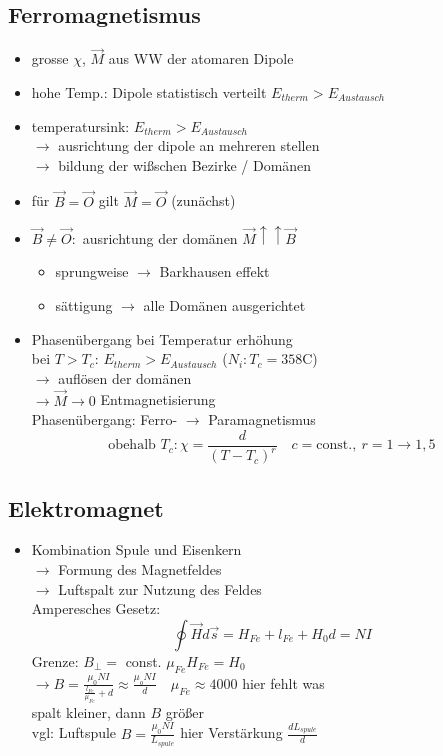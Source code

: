 \documentclass[titlepage,12pt,a4paper,ngerman]{report}
\newcommand{\tx}[1]{\textrm{#1}}
\begin{document}
\subsection{Ferromagnetismus}
\begin{itemize}
	\item grosse $\chi$, $\vec{M}$ aus WW der atomaren Dipole
	\item hohe Temp.: Dipole statistisch verteilt $E_{therm}>E_{Austausch}$
	\item temperatursink: $E_{therm}>E_{Austausch}$\\
	$\rightarrow$ ausrichtung der dipole an mehreren stellen\\
	$\rightarrow$ bildung der wißschen Bezirke / Domänen
	\item für $\vec{B} = \vec{O}$ gilt $ \vec{M} = \vec{O}$ (zunächst)
	\item $\vec{B} \neq \vec{O}:$ ausrichtung der domänen $\vec{M} \uparrow \uparrow \vec{B}$
	\begin{itemize}
		\item sprungweise $\rightarrow$ Barkhausen effekt
		\item sättigung $\rightarrow$ alle Domänen ausgerichtet
	\end{itemize}
	\item Phasenübergang bei Temperatur erhöhung\\
	bei $T>T_c$: $E_{therm}>E_{Austausch}$  ($N_i: T_c = 358\tx{C}$)\\
	$\rightarrow$ auflösen der domänen\\
	$\rightarrow \vec{M} \rightarrow 0$ Entmagnetisierung\\
	Phasenübergang: Ferro- $\rightarrow$ Paramagnetismus
	$$\tx{obehalb } T_c: \chi = \frac{d}{(T-T_c)^r} \quad c = \tx{const.},\ r = 1 \rightarrow 1,5$$
\end{itemize}
\subsection{Elektromagnet}
\begin{itemize}
	\item Kombination Spule und Eisenkern\\
	$\rightarrow$ Formung des Magnetfeldes\\
	$\rightarrow$ Luftspalt zur Nutzung des Feldes\\
	Amperesches Gesetz: $$\oint \vec{H}d\vec{s}=H_{Fe}+l_{Fe} + H_0d=NI$$
	Grenze: $B_\perp =$ const. $\mu_{Fe} H_{Fe} = H_0$\\
	$\rightarrow B = \frac{\mu_0 N I}{\frac{l_{Fe}}{\mu_{Fe}}+d} \approx \frac{\mu_o NI}{d}\quad \mu_{Fe}\approx 4000$ hier fehlt was\\
	spalt kleiner, dann $B$ größer\\
	vgl: Luftspule $B= \frac{\mu_0 NI}{L_{spule}}$ hier Verstärkung $\frac{dL_{spule}}{d}$
\end{itemize}
\end{document}
